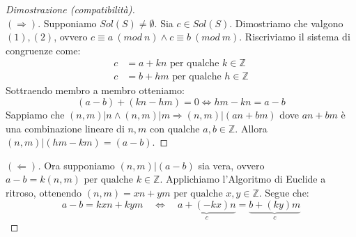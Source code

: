 \documentclass[12pt]{article}
\newcommand{\Z}{\mathbb{Z}}
\newcommand{\sesolose}{\Leftrightarrow}
\newcommand{\implica}{\Longrightarrow}
\newcommand{\pq}{\text{ per qualche }}
\renewcommand\qedsymbol{$\blacksquare$}
\begin{document}
\renewcommand\qedsymbol{$\square$}
\begin{proof}[Dimostrazione (compatibilità)]\ \\
	$(\implica)$.
	Supponiamo $Sol(S) \ne \emptyset$. Sia $c \in Sol(S)$. Dimostriamo che valgono $(1), (2)$, ovvero $c \equiv a\ (mod \ n) \land c \equiv b\ (mod \ m)$. Riscriviamo il sistema di congruenze come:
	\begin{align*}c & = a + kn \pq k \in \Z \\
		c & = b + hm \pq h \in \Z
	\end{align*}
	Sottraendo membro a membro otteniamo:
	$$ (a-b) + (kn - hm) = 0 \sesolose hm-kn = a-b $$
	Sappiamo che $(n, m)|n \land (n,m)|m \implica (n,m)|(an+bm)$ dove $an + bm$ è una combinazione lineare di $n, m$ con qualche $a, b \in \Z$. Allora $(n, m) | (hm - km) = (a - b)$.
\end{proof}

\begin{proof}[$(\Longleftarrow)$]
	Ora supponiamo $(n, m) | (a - b)$ sia vera, ovvero $a -b = k(n,m) \pq k \in \Z$. Applichiamo l'Algoritmo di Euclide a ritroso, ottenendo $(n, m) = xn + ym \pq x, y \in \Z$. Segue che:
	$$ a - b = kxn + kym \quad\sesolose\quad \underbrace{a + (-kx)n}_c  =  \underbrace{b +(ky)m}_c $$
\end{proof}
\end{document}
